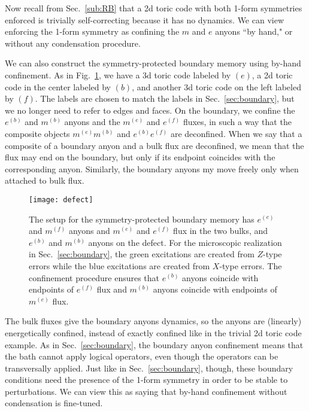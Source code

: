 Now recall from Sec.~\ref{sub:RB} that a 2d toric code with both 1-form symmetries enforced is trivially self-correcting because it has no dynamics. We can view enforcing the 1-form symmetry as confining the $m$ and $e$ anyons ``by hand," or without any condensation procedure. 

We can also construct the symmetry-protected boundary memory using by-hand confinement. As in Fig.~\ref{fig:defect}, we have a 3d toric code labeled by $(e)$, a 2d toric code in the center labeled by $(b)$, and another 3d toric code on the left labeled by $(f)$. The labels are chosen to match the labels in Sec.~\ref{sec:boundary}, but we no longer need to refer to edges and faces. On the boundary, we confine the $e^{(b)}$ and $m^{(b)}$ anyons and the $m^{(e)}$ and $e^{(f)}$ fluxes, in such a way that the composite objects $m^{(e)}m^{(b)}$ and $e^{(b)}e^{(f)}$ are deconfined. When we say that a composite of a boundary anyon and a bulk flux are deconfined, we mean that the flux may end on the boundary, but only if its endpoint coincides with the corresponding anyon.  Similarly, the boundary anyons my move freely only when attached to bulk flux.

\begin{figure}[th!]
    \centering
    \texttt{[image: defect]}
    \caption[Effective description of the model]{The setup for the symmetry-protected boundary memory has $e^{(e)}$ and $m^{(f)}$ anyons and $m^{(e)}$ and $e^{(f)}$ flux in the two bulks, and $e^{(b)}$ and $m^{(b)}$ anyons on the defect. For the microscopic realization in Sec.~\ref{sec:boundary}, the green excitations are created from $Z$-type errors while the blue excitations are created from $X$-type errors. The confinement procedure ensures that $e^{(b)}$ anyons coincide with endpoints of $e^{(f)}$ flux and $m^{(b)}$ anyons coincide with endpoints of $m^{(e)}$ flux.}
    \label{fig:defect}
\end{figure}

The bulk fluxes give the boundary anyons dynamics, so the anyons are (linearly) energetically confined, instead of exactly confined like in the trivial 2d toric code example.
As in Sec.~\ref{sec:boundary}, the boundary anyon confinement means that the bath cannot apply logical operators, even though the operators can be transversally applied. Just like in Sec.~\ref{sec:boundary}, though, these boundary conditions need the presence of the 1-form symmetry in order to be stable to perturbations. We can view this as saying that by-hand confinement without condensation is fine-tuned.

